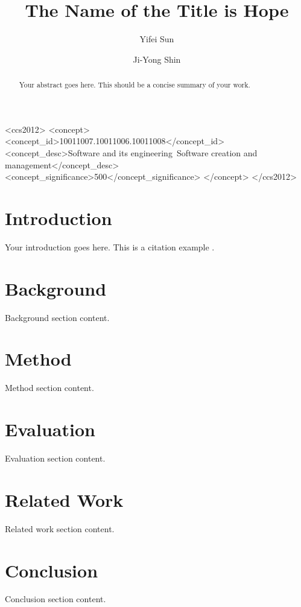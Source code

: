 \documentclass[sigplan,screen,review]{acmart}
\begin{document}
\title{The Name of the Title is Hope}

\author{Yifei Sun}

\author{Ji-Yong Shin}


\renewcommand{\shortauthors}{Sun et al.}

\begin{abstract}
  Your abstract goes here. This should be a concise summary of your work.
\end{abstract}

\begin{CCSXML}
  <ccs2012>
  <concept>
  <concept_id>10011007.10011006.10011008</concept_id>
  <concept_desc>Software and its engineering~Software creation and
  management</concept_desc>
  <concept_significance>500</concept_significance>
  </concept>
  </ccs2012>
\end{CCSXML}



\maketitle

\section{Introduction}
Your introduction goes here. This is a citation example \cite{example}.

\section{Background}
Background section content.

\section{Method}
Method section content.

\section{Evaluation}
Evaluation section content.

\section{Related Work}
Related work section content.

\section{Conclusion}
Conclusion section content.



\end{document}

